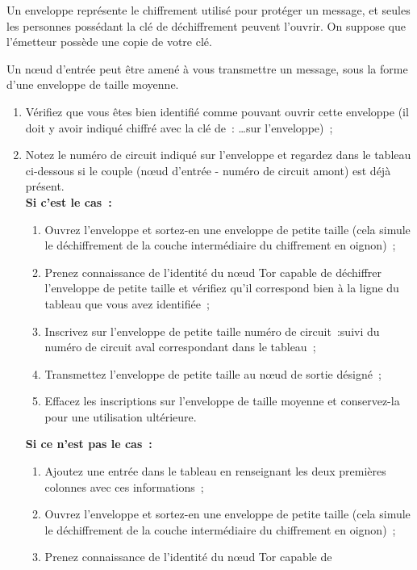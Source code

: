 \documentclass[a4paper,twoside,french]{article}
\begin{document}
  Un enveloppe représente le chiffrement utilisé pour protéger un
  message, et seules les personnes possédant la clé de déchiffrement
  peuvent l'ouvrir. On suppose que l'émetteur possède une copie de
  votre clé.

  Un n\oe ud d'entrée peut être amené à vous transmettre un message,
  sous la forme d'une enveloppe de taille moyenne.

  \begin{enumerate}
  \item Vérifiez que vous êtes bien identifié comme pouvant ouvrir
    cette enveloppe (il doit y avoir indiqué \og chiffré avec la clé
    de~: \ldots\fg sur l'enveloppe)~;
  \item Notez le numéro de circuit indiqué sur l'enveloppe et regardez
    dans le tableau ci-dessous si le couple (n\oe ud d'entrée - numéro
    de circuit amont) est déjà présent.\\
    \textbf{Si c'est le cas~:}
    \begin{enumerate}
    \item Ouvrez l'enveloppe et sortez-en une enveloppe de petite
      taille (cela simule le déchiffrement de la couche intermédiaire
      du chiffrement en oignon)~;
    \item Prenez connaissance de l'identité du n\oe ud Tor capable de
      déchiffrer l'enveloppe de petite taille et vérifiez qu'il
      correspond bien à la ligne du tableau que vous avez identifiée~;
    \item Inscrivez sur l'enveloppe de petite taille \og numéro de
      circuit~:\fg suivi du numéro de circuit aval correspondant dans
      le tableau~;
    \item Transmettez l'enveloppe de petite taille au n\oe ud de
      sortie désigné~;
    \item Effacez les inscriptions sur l'enveloppe de taille moyenne
      et conservez-la pour une utilisation ultérieure.
    \end{enumerate}
    \textbf{Si ce n'est pas le cas~:}
    \begin{enumerate}
    \item Ajoutez une entrée dans le tableau en renseignant les deux
      premières colonnes avec ces informations~;
    \item Ouvrez l'enveloppe et sortez-en une enveloppe de petite
      taille (cela simule le déchiffrement de la couche intermédiaire
      du chiffrement en oignon)~;
    \item Prenez connaissance de l'identité du n\oe ud Tor capable de

\end{enumerate}
\end{enumerate}
\end{document}
